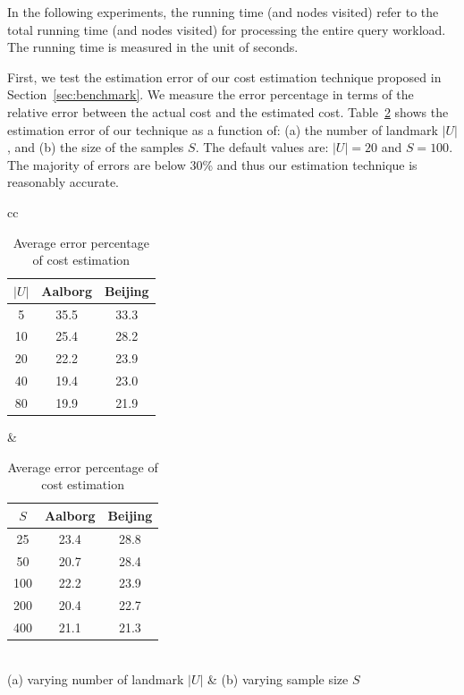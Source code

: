 In the following experiments, the running time (and nodes visited) refer to the total running time (and nodes visited) for processing the entire query workload. The running time is measured in the unit of seconds.





%
First, we test the estimation error of our cost estimation technique proposed in Section~\ref{sec:benchmark}.
We measure the error percentage in terms of the relative error between the actual cost and the estimated cost.
Table~\ref{tbl:estcost} shows the estimation error of our technique
as a function of: (a) the number of landmark $|U|$, and (b) the size of the samples $S$.
The default values are: $|U|=20$ and $S=100$.
The majority of errors are below 30\% and thus our estimation technique is reasonably accurate.





\begin{table}
\center
\begin{tabular}{cc}
    \begin{tabular}{|c|c|c|}
    \hline
    $|U|$ & Aalborg & Beijing \\ \hline \hline
     5 & 35.5 & 33.3 \\ \hline
     10 & 25.4 & 28.2 \\ \hline
     20 & 22.2 & 23.9 \\ \hline
     40 & 19.4 & 23.0  \\ \hline
     80 & 19.9 & 21.9 \\ \hline
    \end{tabular}
    &
    \begin{tabular}{|c|c|c|}
    \hline
    $S$ & Aalborg & Beijing \\ \hline \hline
     25 & 23.4 & 28.8 \\ \hline
     50 & 20.7 & 28.4 \\ \hline
     100 & 22.2 & 23.9 \\ \hline
     200 & 20.4 & 22.7 \\ \hline
     400 & 21.1 & 21.3 \\ \hline
    \end{tabular}
    \\
    (a) varying number of landmark $|U|$ & (b) varying sample size $S$
\end{tabular}
    \caption{Average error percentage of cost estimation}
    \label{tbl:estcost}
\end{table}









